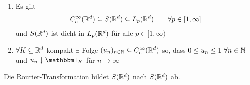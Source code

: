\begin{proposition}\label{proposition7.1}\
\begin{enumerate}[label=(\alph*)]
\item Es gilt
\begin{align*}
C_c^\infty(\mathbb{R}^d)\subseteq S(\mathbb{R}^d)\subseteq L_p(\mathbb{R}^d)\qquad\forall p\in[1,\infty]
\end{align*}
und $S(\mathbb{R}^d)$ ist dicht in $L_p(\mathbb{R}^d)$ für alle $p\in[1,\infty)$
\item $\forall K\subseteq\mathbb{R}^d$ kompakt $\exists$ Folge $(u_n)_{n\in\mathbb{N}}\subseteq C_c^\infty(\mathbb{R}^d)$ so, dass $0\leq u_n\leq 1~\forall n\in\mathbb{N}$ und $u_n\downarrow\indi_K$ für $n\to\infty$
\end{enumerate}
\end{proposition}


\begin{theorem}\label{theorem7.2}
Die Rourier-Transformation bildet $S(\mathbb{R}^d)$ nach $S(\mathbb{R}^d)$ ab.
\end{theorem}

